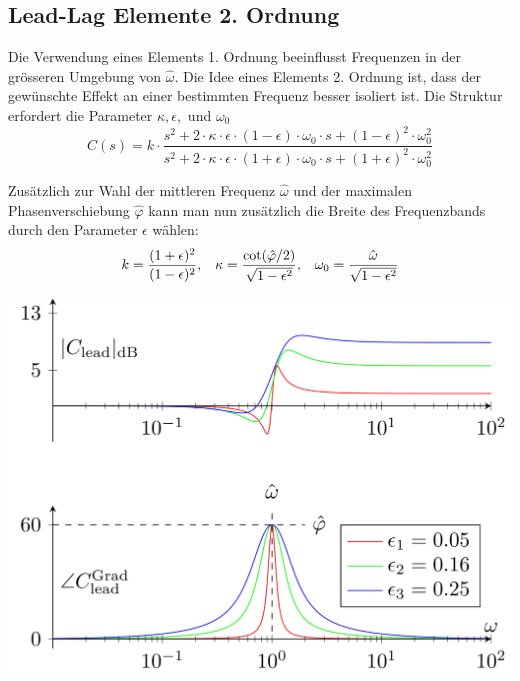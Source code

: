     \subsection{Lead-Lag Elemente 2. Ordnung}
        Die Verwendung eines Elements 1. Ordnung beeinflusst Frequenzen in der grösseren Umgebung von $\hat{\omega}$. Die Idee eines Elements 2. Ordnung ist, dass der gewünschte Effekt an einer bestimmten Frequenz besser isoliert ist. Die Struktur erfordert die Parameter $\kappa, \epsilon,$ und $\omega_0$
        \[
        C(s) = k\cdot\frac{s^2 +2\cdot\kappa\cdot\epsilon\cdot(1-\epsilon)\cdot\omega_0\cdot s+(1-\epsilon)^2\cdot\omega_0^2}{s^2+2\cdot\kappa\cdot\epsilon\cdot(1+\epsilon)\cdot\omega_0\cdot s+(1+\epsilon)^2\cdot\omega_0^2}\]
        
        Zusätzlich zur Wahl der mittleren Frequenz $\hat{\omega}$ und der maximalen Phasenverschiebung $\hat{\varphi}$ kann man nun zusätzlich die Breite des Frequenzbands durch den Parameter $\epsilon$ wählen:
        \[ k = \frac{(1+\epsilon)^2}{(1-\epsilon)^2},\hspace{3mm} \kappa=\frac{\cot(\hat{\varphi}/2)}{\sqrt{1-\epsilon^2}},\hspace{3mm} \omega_0 = \frac{\hat{\omega}}{\sqrt{1-\epsilon^2}}\]
        \begin{center}
            \includegraphics[width = 0.8\linewidth]{images/09/Lead_Lag_2.jpg}
        \end{center}
            
